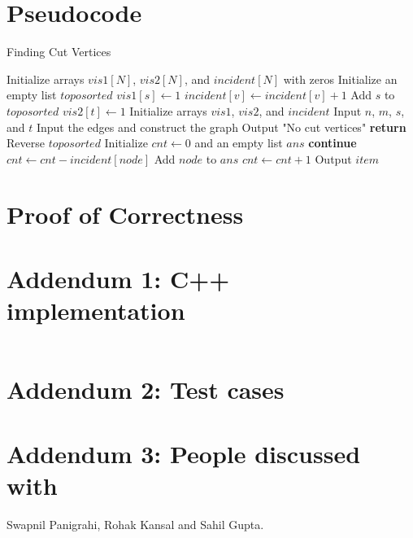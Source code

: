 \documentclass{article}
\begin{document}
\newpage 
\section{Pseudocode}

\begin{algorithm}[H]
\caption{Finding Cut Vertices}
\begin{algorithmic}[1]
    \State Initialize arrays $vis1[N]$, $vis2[N]$, and $incident[N]$ with zeros
    \State Initialize an empty list $toposorted$
        \State $vis1[s] \gets 1$
                \State {}
            \EndIf
            \State $incident[v] \gets incident[v] + 1$
        \EndFor
        \State Add $s$ to $toposorted$
    \EndFunction
        \State $vis2[t] \gets 1$
                \State {}
            \EndIf
        \EndFor
    \EndFunction
    \State Initialize arrays $vis1$, $vis2$, and $incident$
    \State Input $n$, $m$, $s$, and $t$
    \State Input the edges and construct the graph
    \State {}
    \State {}
        \State Output "No cut vertices"
        \State \textbf{return}
    \EndIf
    \State Reverse $toposorted$
    \State Initialize $cnt \gets 0$ and an empty list $ans$
            \State \textbf{continue}
        \EndIf
        \State $cnt \gets cnt - incident[node]$
            \State Add $node$ to $ans$
        \EndIf
                \State $cnt \gets cnt + 1$
            \EndIf
        \EndFor
    \EndFor
        \State Output $item$
    \EndFor
\end{algorithmic}
\end{algorithm}

\section{Proof of Correctness}

\section*{Addendum 1: C++ implementation}

\inputminted{cpp}{stcut.cpp}

\section*{Addendum 2: Test cases}




\section*{Addendum 3: People discussed with}

Swapnil Panigrahi, Rohak Kansal and Sahil Gupta.
\end{document}
